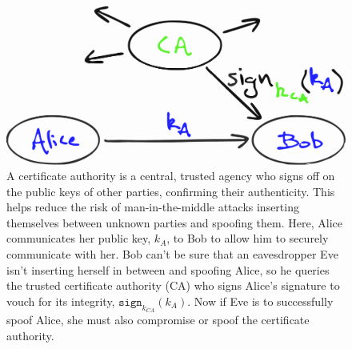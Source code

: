 \begin{figure}[!htb]
	\centering
	\includegraphics[width=\columnwidth]{figures/Certificate_authority}
	\caption{A certificate authority is a central, trusted agency who signs off on the public keys of other parties, confirming their authenticity. This helps reduce the risk of man-in-the-middle attacks inserting themselves between unknown parties and spoofing them. Here, Alice communicates her public key, $k_A$, to Bob to allow him to securely communicate with her. Bob can't be sure that an eavesdropper Eve isn't inserting herself in between and spoofing Alice, so he queries the trusted certificate authority (CA) who signs Alice's signature to vouch for its integrity, $\mathtt{sign}_{k_{CA}}(k_A)$. Now if Eve is to successfully spoof Alice, she must also compromise or spoof the certificate authority.} \label{fig:certificate}
\end{figure}